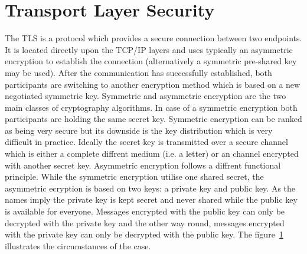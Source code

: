 

\section{Transport Layer Security}


The TLS is a protocol which provides a secure connection between two endpoints. It is located directly upon the TCP/IP layers and uses typically an asymmetric encryption to establish the connection (alternatively a symmetric pre-shared key may be used). After the communication has successfully established, both participants are switching to another encryption method which is based on a new negotiated symmetric key.
%
%
Symmetric and asymmetric encryption are the two main classes of cryptography algorithms.
In case of a symmetric encryption both participants are holding the same secret key. 
Symmetric encryption can be ranked as being very secure but its downside is the key distribution which is very difficult in practice. 
Ideally the secret key is transmitted over a secure channel which is either a complete diffrent medium (i.e. a letter) or an channel encrypted with another secret key.
Asymmetric encryption follows a diffrent functional principle. While the symmetric encryption utilise one shared secret, the asymmetric ecryption is based on two keys: a private key and public key. As the names imply the private key is kept secret and never shared while the public key is available for everyone. Messages encrypted with the public key can only be decrypted with the private key and the other way round, messages encrypted with the private key can only be decrypted with the public key. The figure~\ref{fig:asymmetric_encryption} illustrates the circumstances of the case.\\
\begin{figure}[htb]
	\centering%
	\\
	\label{fig:asymmetric_encryption}
\end{figure}


